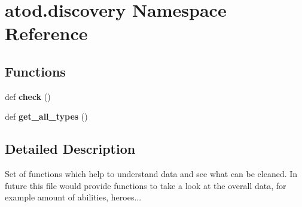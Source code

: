 \hypertarget{namespaceatod_1_1discovery}{}\section{atod.\+discovery Namespace Reference}
\label{namespaceatod_1_1discovery}
\subsection*{Functions}
\begin{DoxyCompactItemize}
\item 
def {\bfseries check} ()\hypertarget{namespaceatod_1_1discovery_a30d07b0bced84b223e86785e4d3d9886}{}\label{namespaceatod_1_1discovery_a30d07b0bced84b223e86785e4d3d9886}

\item 
def {\bfseries get\+\_\+all\+\_\+types} ()\hypertarget{namespaceatod_1_1discovery_ae6f4fa5a923111a3775dfb0f52f20719}{}\label{namespaceatod_1_1discovery_ae6f4fa5a923111a3775dfb0f52f20719}

\end{DoxyCompactItemize}


\subsection{Detailed Description}
\begin{DoxyVerb}Set of functions which help to understand data and see what can be
cleaned.
In future this file would provide functions to take a look at the overall
data, for example amount of abilities, heroes...
\end{DoxyVerb}
 